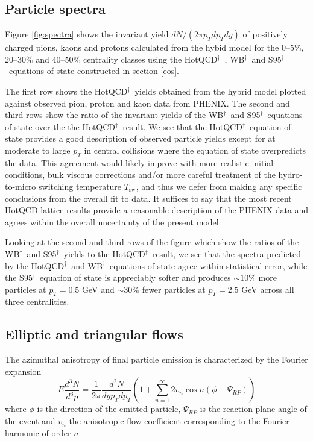 \documentclass[aps,prc,reprint,amsmath,nofootinbib,superscriptaddress]{revtex4-1}
\newcommand{\hotqcd}{HotQCD$^\dagger$~}
\newcommand{\wb}{WB$^\dagger$~}
\newcommand{\spv}{S95$^\dagger$~}
\begin{document}
\subsection{Particle spectra}
\label{spectra}

Figure \ref{fig:spectra} shows the invariant yield $dN/(2\pi p_T dp_T dy)$ of positively charged pions, kaons and protons calculated from the hybid model for the $0$--$5\%$, $20$--$30\%$
and $40$--$50\%$ centrality classes using the \hotqcd, \wb and \spv equations of state constructed in section \ref{eos}. 

The first row shows the \hotqcd yields obtained from the hybrid model plotted against observed pion, proton and kaon data from PHENIX. The second and third rows show the ratio of the invariant yields of 
the \wb and \spv equations of state over the the \hotqcd result. We see that the \hotqcd equation of state provides a good description of observed particle yields except for at moderate 
to large $p_T$ in central collisions where the equation of state overpredicts the data. This agreement would likely improve with more realistic initial conditions, bulk viscous corrections 
and/or more careful treatment of the hydro-to-micro switching temperature $T_\text{sw}$, and thus we defer from making any specific conclusions from the overall fit to data. It suffices to say that the 
most recent HotQCD lattice results provide a reasonable description of the PHENIX data and agrees within the overall uncertainty of the present model. 

Looking at the second and third rows of the figure which show the ratios of the \wb and \spv yields to the \hotqcd result, we see that the spectra predicted by the \hotqcd and \wb equations of state 
agree within statistical error, while the \spv equation of state is appreciably softer and produces $\sim 10\%$ more particles at $p_T = 0.5$ GeV and $\sim 30\%$ fewer particles at $p_T=2.5$ GeV across all three centralities.

\subsection{Elliptic and triangular flows}
\label{flow}

The azimuthal anisotropy of final particle emission is characterized by the Fourier expansion
\begin{equation}
 E \frac{d^3N}{d^3p} = \frac{1}{2\pi} \frac{d^2N}{dy p_T dp_T} \left(1 + \sum\limits_{n=1}^\infty 2 v_n \cos n(\phi - \Psi_{RP}) \right)
\end{equation}
where $\phi$ is the direction of the emitted particle, $\Psi_{RP}$ is the reaction plane angle of the event and $v_n$ the anisotropic flow coefficient corresponding to the Fourier harmonic of order $n$.
\end{document}
